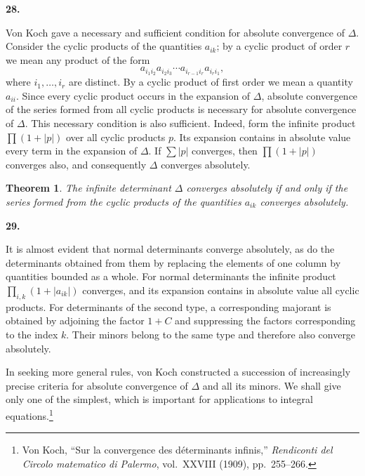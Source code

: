 \documentclass[
  paper=b5,
  fontsize=13pt,
  twoside=true,
  open=any,
  bookmarkpackage=false,
  chapterprefix=true,
  headings=normal
]{scrbook}
\newtheorem*{theorem}{Theorem}
\theoremstyle{definition}
\newcommand{\numberedparagraph}[1]{%
  \par\medskip\phantomsection\label{sec:#1}%
  \noindent\textbf{#1.}\enspace
}
\begin{document}
\numberedparagraph{28}
Von Koch gave a necessary and sufficient condition for absolute convergence of $\Delta$. Consider the
cyclic products of the quantities $a_{ik}$; by a cyclic product of order $r$ we mean any product of the form
\[
 a_{i_1i_2}a_{i_2i_3}\cdots a_{i_{r-1}i_r}a_{i_ri_1},
\]
where $i_1,\ldots,i_r$ are distinct. By a cyclic product of first order we mean a quantity $a_{ii}$. Since every cyclic product occurs in the expansion of $\Delta$, absolute convergence of the series formed from all cyclic products is necessary for absolute convergence of $\Delta$. This necessary condition is also sufficient. Indeed, form the infinite product $\prod(1+|p|)$ over all cyclic products $p$. Its expansion contains in absolute value every term in the expansion of $\Delta$. If $\sum|p|$ converges, then $\prod(1+|p|)$ converges also, and consequently $\Delta$ converges absolutely.

\begin{theorem}
The infinite determinant $\Delta$ converges absolutely if and only if the series formed from the cyclic products of the quantities $a_{ik}$ converges absolutely.
\end{theorem}

\numberedparagraph{29}
It is almost evident that normal determinants converge absolutely, as do the determinants obtained from them by replacing the elements of one column by quantities bounded as a whole. For normal determinants the infinite product $\prod_{i,k}(1+|a_{ik}|)$ converges, and its expansion contains in absolute value all cyclic products. For determinants of the second type, a corresponding majorant is obtained by adjoining the factor $1+C$ and suppressing the factors corresponding to the index $k$. Their minors belong to the same type and therefore also converge absolutely.

In seeking more general rules, von Koch constructed a succession of increasingly precise criteria for absolute convergence of $\Delta$ and all its minors. We shall give only one of the simplest, which is important for applications to integral equations.\footnote{Von Koch, ``Sur la convergence des d\'eterminants infinis,'' \emph{Rendiconti del Circolo matematico di Palermo}, vol.~XXVIII (1909), pp.~255--266.}
\end{document}

